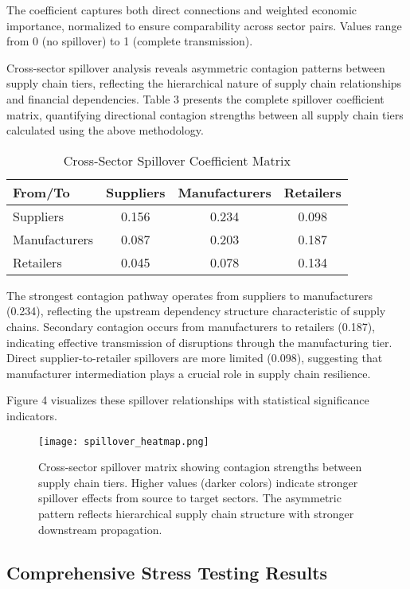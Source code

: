 \documentclass[a4 paper, 11pt,twoside]{article}
\newcommand{\0}{\Bf{0}}
\theoremstyle{definition}
\begin{document}
The coefficient captures both direct connections and weighted economic importance, normalized to ensure comparability across sector pairs. Values range from 0 (no spillover) to 1 (complete transmission).

Cross-sector spillover analysis reveals asymmetric contagion patterns between supply chain tiers, reflecting the hierarchical nature of supply chain relationships and financial dependencies. Table 3 presents the complete spillover coefficient matrix, quantifying directional contagion strengths between all supply chain tiers calculated using the above methodology.

\begin{table}[H]
\centering
\caption{Cross-Sector Spillover Coefficient Matrix}
\begin{tabular}{@{}lccc@{}}
\toprule
\textbf{From/To} & \textbf{Suppliers} & \textbf{Manufacturers} & \textbf{Retailers} \\
\midrule
Suppliers & 0.156 & 0.234 & 0.098 \\
Manufacturers & 0.087 & 0.203 & 0.187 \\
Retailers & 0.045 & 0.078 & 0.134 \\
\bottomrule
\end{tabular}
\end{table}

The strongest contagion pathway operates from suppliers to manufacturers (0.234), reflecting the upstream dependency structure characteristic of supply chains. Secondary contagion occurs from manufacturers to retailers (0.187), indicating effective transmission of disruptions through the manufacturing tier. Direct supplier-to-retailer spillovers are more limited (0.098), suggesting that manufacturer intermediation plays a crucial role in supply chain resilience.

Figure 4 visualizes these spillover relationships with statistical significance indicators.

\begin{figure}[H]
\centering
\texttt{[image: spillover\_heatmap.png]}
\caption{Cross-sector spillover matrix showing contagion strengths between supply chain tiers. Higher values (darker colors) indicate stronger spillover effects from source to target sectors. The asymmetric pattern reflects hierarchical supply chain structure with stronger downstream propagation.}
\end{figure}

\subsection{Comprehensive Stress Testing Results}
\end{document}
